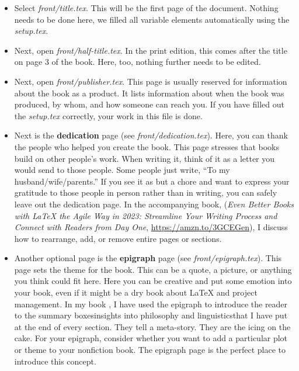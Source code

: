 \begin{itemize}
    \item Select \textit{front/title.tex}. This will be the first page of the document. Nothing needs to be done here, we filled all variable elements automatically using the \textit{setup.tex}.

    \item Next, open \textit{front/half-title.tex}. In the print edition, this comes after the title on page 3 of the book. Here, too, nothing further needs to be edited.

    \item Next, open \textit{front/publisher.tex}. This page is usually reserved for information about the book as a product. It lists information about when the book was produced, by whom, and how someone can reach you. If you have filled out the \textit{setup.tex} correctly, your work in this file is done.

    \item Next is the \textbf{dedication} page (see \textit{front/dedication.tex}). Here, you can thank the people who helped you create the book. This page stresses that books build on other people's work. When writing it, think of it as a letter you would send to those people. Some people just write, ``To my husband/wife/parents.'' If you see it as but a chore and want to express your gratitude to those people in person rather than in writing, you can safely leave out the dedication page. In the accompanying book, (\textit{Even Better Books with LaTeX the Agile Way in 2023: Streamline Your Writing Process and Connect with Readers from Day One}, \url{https://amzn.to/3GCEGen}), I discuss how to rearrange, add, or remove entire pages or sections.



    \item Another optional page is the \textbf{epigraph} page (see \textit{front/epigraph.tex}). This page sets the theme for the book. This can be a quote, a picture, or anything you think could fit here. Here you can be creative and put some emotion into your book, even if it might be a dry book about LaTeX and project management. In my book , I have used the epigraph to introduce the reader to the summary boxes\emdash{}insights into philosophy and linguistics\emdash{}that I have put at the end of every section. They tell a meta-story. They are the icing on the cake. For your epigraph, consider whether you want to add a particular plot or theme to your nonfiction book. The epigraph page is the perfect place to introduce this concept.


\end{itemize}
